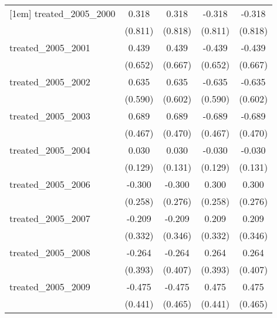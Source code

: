{\begin{tabular}{l*{4}{c}}
[1em]
treated\_2005\_2000&       0.318         &       0.318         &      -0.318         &      -0.318         \\
            &     (0.811)         &     (0.818)         &     (0.811)         &     (0.818)         \\
[1em]
treated\_2005\_2001&       0.439         &       0.439         &      -0.439         &      -0.439         \\
            &     (0.652)         &     (0.667)         &     (0.652)         &     (0.667)         \\
[1em]
treated\_2005\_2002&       0.635         &       0.635         &      -0.635         &      -0.635         \\
            &     (0.590)         &     (0.602)         &     (0.590)         &     (0.602)         \\
[1em]
treated\_2005\_2003&       0.689         &       0.689         &      -0.689         &      -0.689         \\
            &     (0.467)         &     (0.470)         &     (0.467)         &     (0.470)         \\
[1em]
treated\_2005\_2004&       0.030         &       0.030         &      -0.030         &      -0.030         \\
            &     (0.129)         &     (0.131)         &     (0.129)         &     (0.131)         \\
[1em]
treated\_2005\_2006&      -0.300         &      -0.300         &       0.300         &       0.300         \\
            &     (0.258)         &     (0.276)         &     (0.258)         &     (0.276)         \\
[1em]
treated\_2005\_2007&      -0.209         &      -0.209         &       0.209         &       0.209         \\
            &     (0.332)         &     (0.346)         &     (0.332)         &     (0.346)         \\
[1em]
treated\_2005\_2008&      -0.264         &      -0.264         &       0.264         &       0.264         \\
            &     (0.393)         &     (0.407)         &     (0.393)         &     (0.407)         \\
[1em]
treated\_2005\_2009&      -0.475         &      -0.475         &       0.475         &       0.475         \\
            &     (0.441)         &     (0.465)         &     (0.441)         &     (0.465)         \\

\end{tabular}}
